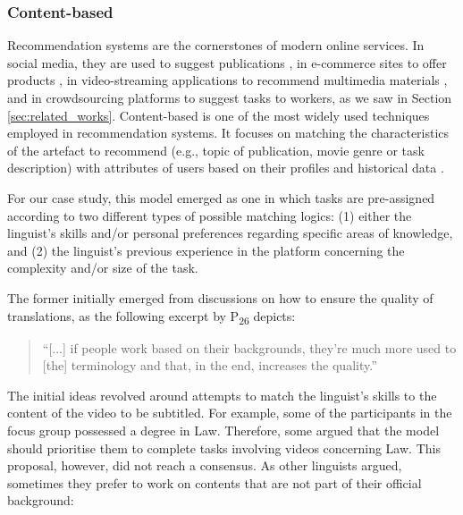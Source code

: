 \subsubsection{Content-based}
Recommendation systems are the cornerstones of modern online services. In social media, they are used to suggest publications \cite{menk2019recommendation}, in e-commerce sites to offer products \cite{li2015online}, in video-streaming applications to recommend multimedia materials \cite{davidson2010youtube}, and in crowdsourcing platforms to suggest tasks to workers, as we saw in Section \ref{sec:related_works}. Content-based is one of the most widely used techniques employed in recommendation systems. It focuses on matching the characteristics of the artefact to recommend (e.g., topic of publication, movie genre or task description) with attributes of users based on their profiles and historical data \cite{isinkaye2015recommendation}. 

For our case study, this model emerged as one in which tasks are pre-assigned according to two different types of possible matching logics: (1) either the linguist's skills and/or personal preferences regarding specific areas of knowledge, and (2) the linguist's previous experience in the platform concerning the complexity and/or size of the task.

The former initially emerged from discussions on how to ensure the quality of translations, as the following excerpt by P\textsubscript{26} depicts:
\begin{quote}
    ``[...] if people work based on their backgrounds, they're much more used to [the] terminology and that, in the end, increases the quality.''
\end{quote}

The initial ideas revolved around attempts to match the linguist's skills to the content of the video to be subtitled. For example, some of the participants in the focus group possessed a degree in Law. Therefore, some argued that the model should prioritise them to complete tasks involving videos concerning Law. This proposal, however, did not reach a consensus. As other linguists argued, sometimes they prefer to work on contents that are not part of their official background:

